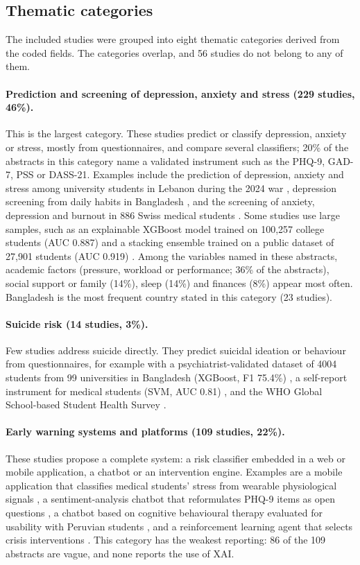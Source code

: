 \documentclass[11pt,a4paper]{article}
\begin{document}
\subsection{Thematic categories}

The included studies were grouped into eight thematic categories derived from the coded fields. The categories overlap, and 56 studies do not belong to any of them.

\paragraph{Prediction and screening of depression, anxiety and stress (229 studies, 46\%).} This is the largest category. These studies predict or classify depression, anxiety or stress, mostly from questionnaires, and compare several classifiers; 20\% of the abstracts in this category name a validated instrument such as the PHQ-9, GAD-7, PSS or DASS-21. Examples include the prediction of depression, anxiety and stress among university students in Lebanon during the 2024 war \cite{S001}, depression screening from daily habits in Bangladesh \cite{S011}, and the screening of anxiety, depression and burnout in 886 Swiss medical students \cite{I468}. Some studies use large samples, such as an explainable XGBoost model trained on 100{,}257 college students (AUC 0.887) \cite{S003} and a stacking ensemble trained on a public dataset of 27{,}901 students (AUC 0.919) \cite{D011}. Among the variables named in these abstracts, academic factors (pressure, workload or performance; 36\% of the abstracts), social support or family (14\%), sleep (14\%) and finances (8\%) appear most often. Bangladesh is the most frequent country stated in this category (23 studies).

\paragraph{Suicide risk (14 studies, 3\%).} Few studies address suicide directly. They predict suicidal ideation or behaviour from questionnaires, for example with a psychiatrist-validated dataset of 4004 students from 99 universities in Bangladesh (XGBoost, F1 75.4\%) \cite{S010}, a self-report instrument for medical students (SVM, AUC 0.81) \cite{I503}, and the WHO Global School-based Student Health Survey \cite{I820}.

\paragraph{Early warning systems and platforms (109 studies, 22\%).} These studies propose a complete system: a risk classifier embedded in a web or mobile application, a chatbot or an intervention engine. Examples are a mobile application that classifies medical students' stress from wearable physiological signals \cite{I388}, a sentiment-analysis chatbot that reformulates PHQ-9 items as open questions \cite{I212}, a chatbot based on cognitive behavioural therapy evaluated for usability with Peruvian students \cite{I476}, and a reinforcement learning agent that selects crisis interventions \cite{S004}. This category has the weakest reporting: 86 of the 109 abstracts are vague, and none reports the use of XAI.
\end{document}
